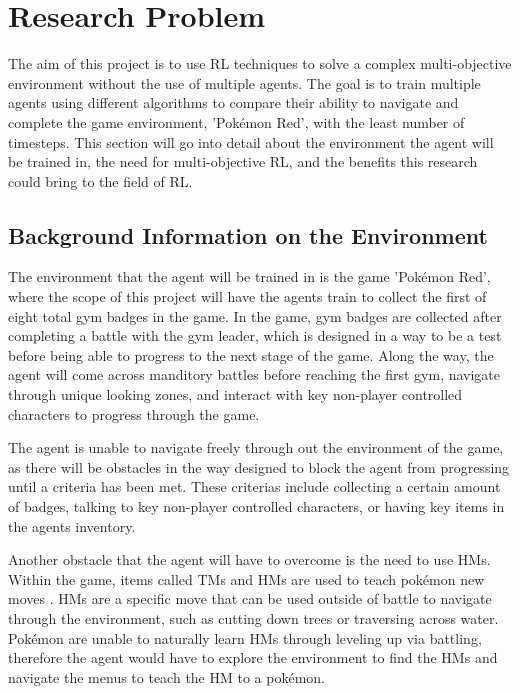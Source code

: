 \section{Research Problem}

The aim of this project is to use RL techniques to solve a complex multi-objective environment without the use of multiple agents. The goal is to train multiple agents using different algorithms to compare their ability to navigate and complete the game environment, 'Pokémon Red', with the least number of timesteps. This section will go into detail about the environment the agent will be trained in, the need for multi-objective RL, and the benefits this research could bring to the field of RL.

\subsection{Background Information on the Environment}

The environment that the agent will be trained in is the game 'Pokémon Red', where the scope of this project will have the agents train to collect the first of eight total gym badges in the game. In the game, gym badges are collected after completing a battle with the gym leader, which is designed in a way to be a test before being able to progress to the next stage of the game. Along the way, the agent will come across manditory battles before reaching the first gym, navigate through unique looking zones, and interact with key non-player controlled characters to progress through the game. 

The agent is unable to navigate freely through out the environment of the game, as there will be obstacles in the way designed to block the agent from progressing until a criteria has been met. These criterias include collecting a certain amount of badges, talking to key non-player controlled characters, or having key items in the agents inventory.  

Another obstacle that the agent will have to overcome is the need to use HMs. Within the game, items called TMs and HMs are used to teach pokémon new moves \cite{SerebiiTeam2016}. HMs are a specific move that can be used outside of battle to navigate through the environment, such as cutting down trees or traversing across water. Pokémon are unable to naturally learn HMs through leveling up via battling, therefore the agent would have to explore the environment to find the HMs and navigate the menus to teach the HM to a pokémon.

